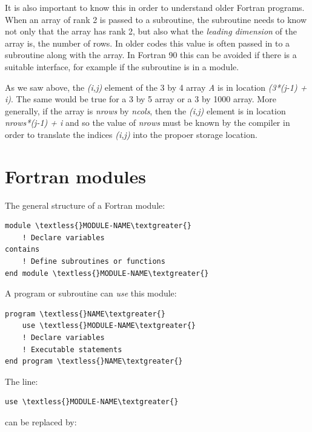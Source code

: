 \documentclass[letterpaper,10pt,english]{sphinxmanual}
\begin{document}
It is also important to know this in order to understand older Fortran
programs.  When an array of rank 2 is passed to a subroutine, the subroutine
needs to know not only that the array has rank 2, but also what the \emph{leading
dimension} of the array is, the number of rows.  In older codes this value
is often passed in to a subroutine along with the array.  In Fortran 90 this
can be avoided if there is a suitable interface, for example if the
subroutine is in a module.

As we saw above, the \emph{(i,j)} element of the 3 by 4 array \emph{A} is in location
\emph{(3*(j-1) + i)}.  The same would be true for a 3 by 5 array or a 3 by 1000
array.  More generally, if the array is \emph{nrows} by \emph{ncols}, then the \emph{(i,j)}
element is in location \emph{nrows*(j-1) + i} and so the value of \emph{nrows} must be
known by the compiler in order to translate the indices \emph{(i,j)} into the
propoer storage location.


\section{Fortran modules}
\label{fortran_modules:fortran-modules}\label{fortran_modules::doc}\label{fortran_modules:id1}
The general structure of a Fortran module:

\begin{Verbatim}[commandchars=\\\{\}]
module \textless{}MODULE-NAME\textgreater{}
    ! Declare variables
contains
    ! Define subroutines or functions
end module \textless{}MODULE-NAME\textgreater{}
\end{Verbatim}

A program or subroutine can \emph{use} this module:

\begin{Verbatim}[commandchars=\\\{\}]
program \textless{}NAME\textgreater{}
    use \textless{}MODULE-NAME\textgreater{}
    ! Declare variables
    ! Executable statements
end program \textless{}NAME\textgreater{}
\end{Verbatim}

The line:

\begin{Verbatim}[commandchars=\\\{\}]
use \textless{}MODULE-NAME\textgreater{}
\end{Verbatim}

can be replaced by:
\end{document}
